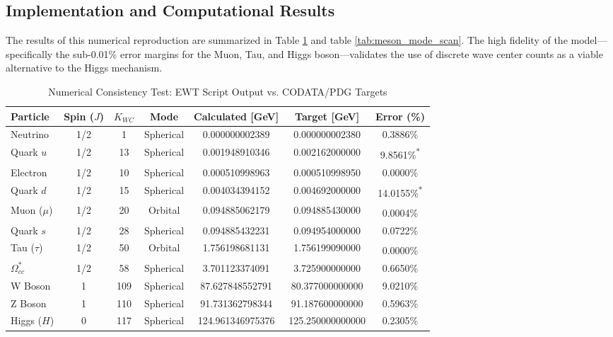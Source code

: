 \documentclass[10pt,a4paper]{article}
\begin{document}
\subsection{Implementation and Computational Results}

The results of this numerical reproduction are summarized in Table \ref{tab:mass_precision_comparison} and table \ref{tab:meson_mode_scan}. The high fidelity of the model—specifically the sub-0.01\% error margins for the Muon, Tau, and Higgs boson—validates the use of discrete wave center counts as a viable alternative to the Higgs mechanism.

\begin{table}[ht]
	\centering
	\small
	\setlength{\tabcolsep}{4pt}
	\caption{Numerical Consistency Test: EWT Script Output vs. CODATA/PDG Targets}
	\label{tab:mass_precision_comparison}
	\begin{tabular}{lcccccc}
		\toprule
		\textbf{Particle} & \textbf{Spin ($J$)} & \textbf{$K_{WC}$} & \textbf{Mode} & \textbf{Calculated [GeV]} & \textbf{Target [GeV]} & \textbf{Error (\%)} \\
		\midrule
		Neutrino         & 1/2 & 1   & Spherical & 0.000000002389 & 0.000000002380 & 0.3886\% \\
		Quark $u$        & 1/2 & 13  & Spherical & 0.001948910346 & 0.002162000000 & 9.8561\%\textsuperscript{*} \\
		Electron         & 1/2 & 10  & Spherical & 0.000510998963 & 0.000510998950 & 0.0000\% \\
		Quark $d$        & 1/2 & 15  & Spherical & 0.004034394152 & 0.004692000000 & 14.0155\%\textsuperscript{*} \\
		Muon ($\mu$)     & 1/2 & 20  & Orbital   & 0.094885062179 & 0.094885430000 & 0.0004\%\textsuperscript{\dag} \\
		Quark $s$        & 1/2 & 28  & Spherical & 0.094885432231 & 0.094954000000 & 0.0722\% \\
		Tau ($\tau$)     & 1/2 & 50  & Orbital   & 1.756198681131 & 1.756199090000 & 0.0000\%\textsuperscript{\dag} \\
		$\Omega_{cc}^*$  & 1/2 & 58  & Spherical & 3.701123374091 & 3.725900000000 & 0.6650\% \\
		W Boson          & 1   & 109 & Spherical & 87.627848552791 & 80.377000000000 & 9.0210\% \\
		Z Boson          & 1   & 110 & Spherical & 91.731362798344 & 91.187600000000 & 0.5963\% \\
		Higgs ($H$)      & 0   & 117 & Spherical & 124.961346975376& 125.250000000000& 0.2305\% \\
		\bottomrule
	\end{tabular}
	

\end{table}
\end{document}
